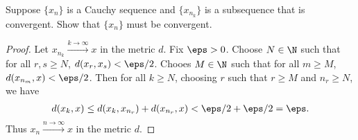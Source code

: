 \documentclass[12pt]{article}
\begin{document}
\begin{homeworkProblem}
  Suppose $\{x_n\}$ is a Cauchy sequence and $\{x_{n_k}\}$ is a subsequence that is convergent.  
  Show that $\{x_n\}$ must be convergent.

\begin{proof}
  Let $ x_{n_{k}}\xrightarrow{k\to\infty}x $ in the metric $ d $. Fix $ \eps>0 $. Choose $ N\in\N $ such that for all $ r,s\geq N $, $ d(x_{r},x_{s})<\eps/2 $. Chooes $ M\in \N $ such that for all $ m\geq M $, $ d(x_{n_{m}},x) <\eps/2 $. Then for all $ k\geq N $, choosing $ r $ such that $ r\geq M $ and $ n_{r}\geq N $, we have
  \begin{align*}
    d(x_{k},x) \leq d(x_{k},x_{n_{r}}) + d(x_{n_{r}},x) < \eps/2+\eps/2 =\eps.
  \end{align*}
  Thus $ x_{n}\xrightarrow{n\to\infty}x $ in the metric $ d $.
\end{proof}

\end{homeworkProblem}
\end{document}
